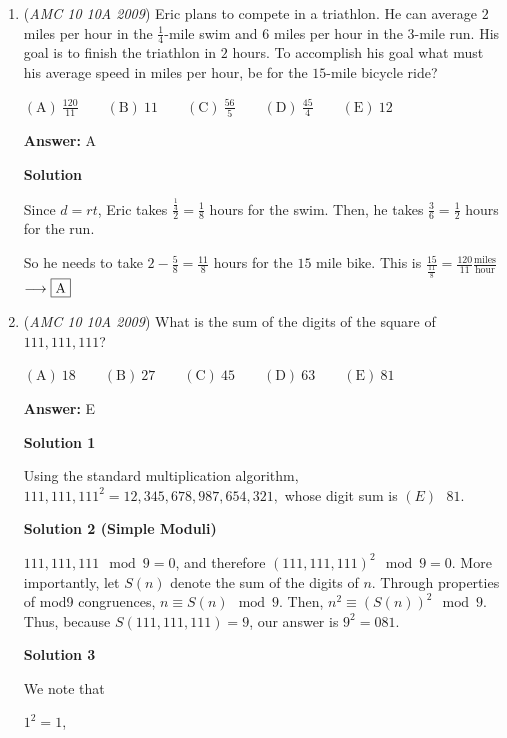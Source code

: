 \begin{enumerate}
	\item (\textit{AMC 10 10A 2009}) Eric plans to compete in a triathlon. He can average $2$ miles per hour in the $\frac{1}{4}$-mile swim and $6$ miles per hour in the $3$-mile run. His goal is to finish the triathlon in $2$ hours. To accomplish his goal what must his average speed in miles per hour, be for the $15$-mile bicycle ride?


 $\mathrm{(A)}\ \frac{120}{11} \qquad \mathrm{(B)}\ 11 \qquad \mathrm{(C)}\ \frac{56}{5} \qquad \mathrm{(D)}\ \frac{45}{4} \qquad \mathrm{(E)}\ 12$

 \textbf{Answer: }A



\textbf{Solution}

Since $d=rt$, Eric takes $\frac{\frac{1}{4}}{2}=\frac{1}{8}$ hours for the swim. Then, he takes $\frac{3}{6}=\frac{1}{2}$ hours for the run. 

 So he needs to take $2-\frac{5}{8}=\frac{11}{8}$ hours for the $15$ mile bike. This is $\frac{15}{\frac{11}{8}}=\frac{120}{11} \frac{\text{miles}}{\text{hour}}$$\longrightarrow \fbox{A}$



	\item (\textit{AMC 10 10A 2009}) What is the sum of the digits of the square of $111,111,111$?


 $\mathrm{(A)}\ 18 \qquad \mathrm{(B)}\ 27 \qquad \mathrm{(C)}\ 45 \qquad \mathrm{(D)}\ 63 \qquad \mathrm{(E)}\ 81$

 \textbf{Answer: }E



\textbf{Solution 1}

Using the standard multiplication algorithm, $111,111,111^2=12,345,678,987,654,321,$ whose digit sum is $\boxed{(E)\text{ }81.}$




\textbf{Solution 2 (Simple Moduli)}

$111{,}111{,}111 \mod 9 = 0$, and therefore $(111{,}111{,}111)^2 \mod 9 = 0$. More importantly, let $S(n)$ denote the sum of the digits of $n$. Through properties of mod9 congruences, $n \equiv S(n) \mod 9$. Then, $n^2 \equiv (S(n))^2 \mod 9$. Thus, because $S(111{,}111{,}111) = 9$, our answer is $9^2 = \boxed{081}$.

 



\textbf{Solution 3}

We note that

 $1^2 = 1$,


\end{enumerate}
